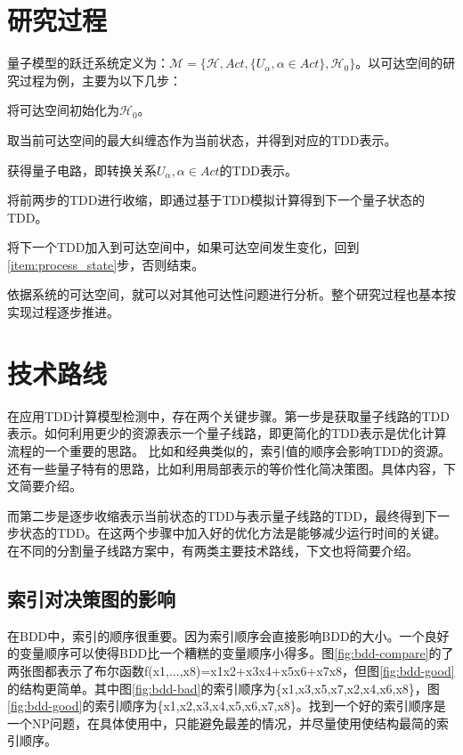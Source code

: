 \section{研究过程}
量子模型的跃迁系统定义为：$\mathcal{M}=\{\mathcal{H},Act,\{U_\alpha,\alpha\in Act\},\mathcal{H}_0\}$。以可达空间的研究过程为例，主要为以下几步：
\begin{myen}
	\item \label{item:process_inital}将可达空间初始化为$\mathcal{H}_0$。
	\item \label{item:process_state}取当前可达空间的最大纠缠态作为当前状态，并得到对应的TDD表示。
	\item \label{item:process_cir}获得量子电路，即转换关系$U_\alpha,\alpha\in Act$的TDD表示。
	\item \label{item:process_cont} 将前两步的TDD进行收缩，即通过基于TDD模拟计算得到下一个量子状态的TDD。
	\item \label{item:process_end}将下一个TDD加入到可达空间中，如果可达空间发生变化，回到\ref{item:process_state}步，否则结束。
\end{myen}
	
依据系统的可达空间，就可以对其他可达性问题进行分析。整个研究过程也基本按实现过程逐步推进。
\section{技术路线}
在应用TDD计算模型检测中，存在两个关键步骤。第一步是获取量子线路的TDD表示。如何利用更少的资源表示一个量子线路，即更简化的TDD表示是优化计算流程的一个重要的思路。
比如和经典类似的，索引值的顺序会影响TDD的资源。还有一些量子特有的思路，比如利用局部表示的等价性化简决策图。具体内容，下文简要介绍。

而第二步是逐步收缩表示当前状态的TDD与表示量子线路的TDD，最终得到下一步状态的TDD。在这两个步骤中加入好的优化方法是能够减少运行时间的关键。在不同的分割量子线路方案中，有两类主要技术路线，下文也将简要介绍。
\subsection{索引对决策图的影响}

在BDD中，索引的顺序很重要。因为索引顺序会直接影响BDD的大小。一个良好的变量顺序可以使得BDD比一个糟糕的变量顺序小得多。图\ref{fig:bdd-compare}的了两张图都表示了布尔函数ƒ(x1,...,x8)=x1x2+x3x4+x5x6+x7x8，但图\ref{fig:bdd-good}的结构更简单。其中图\ref{fig:bdd-bad}的索引顺序为\{x1,x3,x5,x7,x2,x4,x6,x8\}，图\ref{fig:bdd-good}的索引顺序为\{x1,x2,x3,x4,x5,x6,x7,x8\}。找到一个好的索引顺序是一个NP问题，在具体使用中，只能避免最差的情况，并尽量使用使结构最简的索引顺序。

